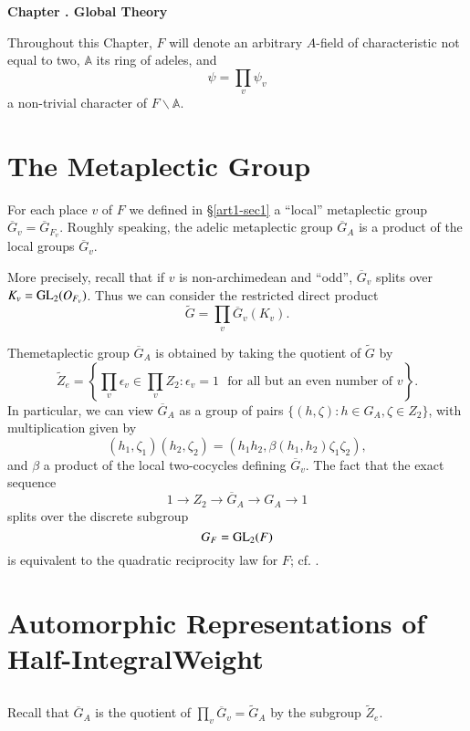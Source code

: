 \bigskip
\begin{center}
{\large\bfseries Chapter .\label{art1-chap-II} Global Theory}
\end{center}
\smallskip

Throughout this Chapter, $F$ will denote an arbitrary $A$-field of characteristic not equal to two, $\mathbb{A}$ its ring of adeles, and
$$
\psi=\prod\limits_{v}\psi_{v}
$$
a non-trivial character of $F\backslash \mathbb{A}$.

\section{The Metaplectic Group}\label{art1-sec8}

For each place $v$ of $F$ we defined in \S\ref{art1-sec1} a ``local'' metaplectic group $\overline{G}_{v}=\overline{G}_{F_{v}}$. Roughly speaking, the adelic metaplectic group $\overline{G}_{A}$ is a product of the local groups $\overline{G}_{v}$.

More precisely, recall that if $v$ is non-archimedean and ``odd'', $\overline{G}_{v}$ splits over $K_{v}=\mathrm{GL}_{2}(O_{F_{v}})$. Thus we can consider the restricted direct product
$$
\widetilde{G}=\prod\limits_{v}\overline{G}_{v}(K_{v}).
$$

The\pageoriginale metaplectic group $\overline{G}_{A}$ is obtained by taking the quotient of $\widetilde{G}$ by
$$
\widetilde{Z}_{e}=\left\{\prod\limits_{v}\epsilon_{v}\in \prod\limits_{v}Z_{2}:\epsilon_{v}=1\text{~ for all but an even number of } v\right\}.
$$
In particular, we can view $\overline{G}_{A}$ as a group of pairs $\{(h,\zeta):h\in G_{A},\zeta\in Z_{2}\}$, with multiplication given by
$$
(h_{1},\zeta_{1})(h_{2},\zeta_{2})=(h_{1}h_{2},\beta(h_{1},h_{2})\zeta_{1}\zeta_{2}),
$$
and $\beta$ a product of the local two-cocycles defining $\overline{G}_{v}$. The fact that the exact sequence
$$
1\to Z_{2}\to \overline{G}_{A}\to G_{A}\to 1
$$
splits over the discrete subgroup
$$
G_{F}=\mathrm{GL}_{2}(F)
$$
is equivalent to the quadratic reciprocity law for $F$; cf. \cite{Weil}.

\section[Automorphic Representations of Half-Integral Weight]{Automorphic Representations of Half-Integral\break Weight}\label{art1-sec9}

\subsection{}\label{art1-sec9.1}
Recall that $\overline{G}_{A}$ is the quotient of $\prod\limits_{v}\overline{G}_{v}=\widetilde{G}_{A}$ by the subgroup $\widetilde{Z}_{e}$.

